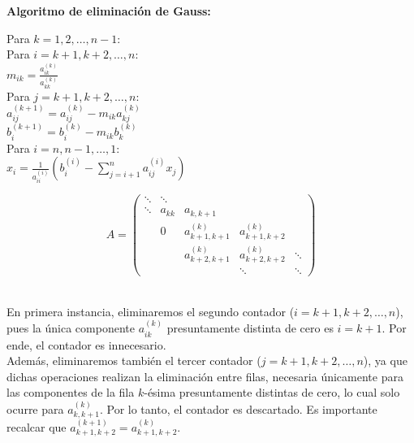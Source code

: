 \begin{homeworkProblem}
\begin{solucion}
\begin{enumerate}[a)]
        \textbf{Algoritmo de eliminación de Gauss:}\\
        \noindent
        \begin{minipage}[t]{0.6\textwidth}
          Para $k = 1, 2, \dotsc, n-1$: \\
          \phantom{Para} Para $i = k+1, k+2, \dotsc, n$: \\
          \phantom{Para Para} $m_{ik} = \frac{a_{ik}^{(k)}}{a_{kk}^{(k)}}$ \\
          \phantom{Para Para} Para $j = k+1, k+2, \dotsc, n$: \\
          \phantom{Para Para Para} $a_{ij}^{(k+1)} = a_{ij}^{(k)} - m_{ik}a_{kj}^{(k)}$ \\
          \phantom{Para Para Para} $b_{i}^{(k+1)} = b_{i}^{(k)} - m_{ik}b_{k}^{(k)}$ \\
          Para $i = n, n-1, \dotsc, 1$: \\
          \phantom{Para} $x_i = \frac{1}{a_{ii}^{(i)}}\left( b_i^{(i)} - \sum_{j=i+1}^n a_{ij}^{(i)}x_j\right)$
        \end{minipage}%
        \hspace{-1cm}%
        \begin{minipage}[t]{0.35\textwidth}
          \[
            A = \begin{pmatrix}
              \ddots & \ddots &  &  &  \\
              \ddots & a_{kk} & a_{k,k+1} &  &  \\
              & 0 & a_{k+1,k+1}^{(k)} & a_{k+1,k+2}^{(k)} &  \\
              &  & a_{k+2,k+1}^{(k)} & a_{k+2,k+2}^{(k)} & \ddots \\
              &  &  & \ddots & \ddots
            \end{pmatrix}
          \]
        \end{minipage}\\
        En primera instancia, eliminaremos el segundo contador ($i = k+1, k+2, \dotsc, n$), pues la única componente $a_{ik}^{(k)}$ presuntamente distinta de cero es $i = k+1$. Por ende, el contador es innecesario. \\
        Además, eliminaremos también el tercer contador ($j = k+1, k+2, \dotsc, n$), ya que dichas operaciones realizan la eliminación entre filas, necesaria únicamente para las componentes de la fila $k$-ésima presuntamente distintas de cero, lo cual solo ocurre para $a_{k,k+1}^{(k)}$. Por lo tanto, el contador es descartado. Es importante recalcar que $a_{k+1,k+2}^{(k+1)} = a_{k+1,k+2}^{(k)}$. \\

\end{enumerate}
\end{solucion}
\end{homeworkProblem}
